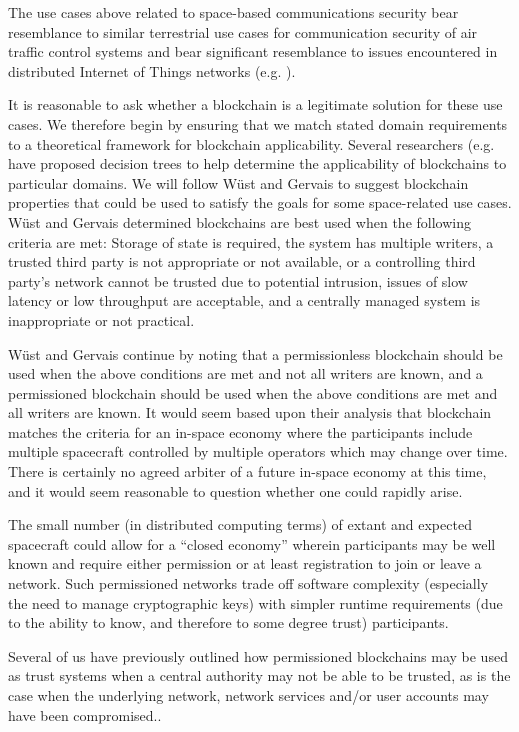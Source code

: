 \documentclass[]{aiaa-tc}%
\begin{document}
The use cases above related to space-based communications security bear resemblance to similar terrestrial use cases for communication security of air traffic control systems\cite{reisman_air_2019} and bear significant resemblance to issues encountered in distributed Internet of Things networks (e.g. \cite{dorri2017lsb, dorri2019mof}).

It is reasonable to ask whether a blockchain is a legitimate solution for these use cases. We therefore begin by ensuring that we match stated domain requirements to a theoretical framework for blockchain applicability. Several researchers (e.g. \cite{wust_gervais_2017,xu_design_2019} have proposed decision trees to help determine the applicability of blockchains to particular domains. We will follow W\"{u}st and Gervais\cite{wust_gervais_2017} to suggest blockchain properties that could be used to satisfy the goals for some space-related use cases. W\"{u}st and Gervais determined blockchains are best used when the following criteria are met: Storage of state is required, the system has multiple writers, a trusted third party is not appropriate or not available, or a controlling third party's network cannot be trusted due to potential intrusion, issues of slow latency or low throughput are acceptable, and a centrally managed system is inappropriate or not practical.

W\"{u}st and Gervais continue by noting that a permissionless blockchain should be used when the above conditions are met and not all writers are known, and a permissioned blockchain should be used when the above conditions are met and all writers are known. It would seem based upon their analysis that blockchain matches the criteria for an in-space economy where the participants include multiple spacecraft controlled by multiple operators which may change over time. There is certainly no agreed arbiter of a future in-space economy at this time, and it would seem reasonable to question whether one could rapidly arise.

The small number (in distributed computing terms) of extant and expected spacecraft could allow for a ``closed economy'' wherein participants may be well known and require either permission or at least registration to join or leave a network. Such permissioned networks trade off software complexity (especially the need to manage cryptographic keys) with simpler runtime requirements (due to the ability to know, and therefore to some degree trust) participants.

Several of us have previously outlined how permissioned blockchains may be used as trust systems when a central authority may not be able to be trusted, as is the case when the underlying network, network services and/or user accounts may have been compromised.\cite{hyland-wood-icssc2019}.
\end{document}
